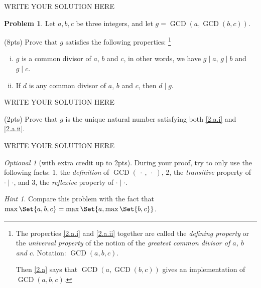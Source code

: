 \documentclass[11pt]{article}
\theoremstyle{plain}
\theoremstyle{definition}
\newtheorem{problem}{Problem}
\theoremstyle{remark}
\newtheorem*{hint}{Hint}
\newtheorem*{optional}{Optional}
\numberwithin{equation}{problem}
\DeclareMathOperator*\GCD{GCD}
\begin{document}
\begin{solution} %
WRITE YOUR SOLUTION HERE
\end{solution}\clearpage %

\begin{problem}\label{p2}
	Let $a, b, c$ be three integers, and let $g=\GCD(a,\GCD(b,c))$. 
	\begin{listinprob}
		\item\label{2.a} (8pts) Prove that $g$ satisfies the following properties: \footnote{
			The properties \ref{2.a.i} and \ref{2.a.ii} together are called the \emph{defining property} or the \emph{universal property} of the notion of the \emph{greatest common divisor of $a$, $b$ and $c$}. Notation: $\GCD(a, b, c)$.
			
			Then \cref{2.a} says that $\GCD(a,\GCD(b, c))$ gives an implementation of $\GCD(a, b, c)$.}
		\begin{enumerate}[(i)]
			\item\label{2.a.i} $g$ is a common divisor of $a$, $b$ and $c$, in other words, we have $g\mid a$, $g\mid b$ and $g\mid c$. 
			\item\label{2.a.ii} If $d$ is any common divisor of $a$, $b$ and $c$, then $d\mid g$.
		\end{enumerate}

\begin{solution} %
WRITE YOUR SOLUTION HERE
\end{solution}\clearpage %
		
		\item\label{2.b} (2pts) 
		Prove that $g$ is the unique natural number satisfying both \ref{2.a.i} and \ref{2.a.ii}.
	\end{listinprob}

\begin{solution} %
WRITE YOUR SOLUTION HERE
\end{solution} %

	\begin{optional}[with extra credit up to 2pts]
		During your proof, try to only use the following facts: 1, the \emph{definition} of $\GCD(\:\cdot\:,\:\cdot\:)$, 2, the \emph{transitive} property of $\cdot\mid\cdot$, and 3, the \emph{reflexive} property of $\cdot\mid\cdot$. 
	\end{optional}
	\begin{hint}
		Compare this problem with the fact that $\max\Set{a,b,c} = \max\Set{a,\max\Set{b,c}}$.
	\end{hint}
\end{problem}
\clearpage
\end{document}

